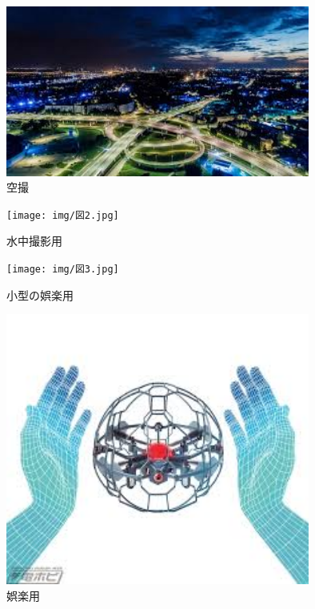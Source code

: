 \begin{figure}[htbp]
  \begin{center}
    \includegraphics[width=100mm]{img/空撮.jpg}
    \end{center}
  \caption{空撮}
 \label{fig:robot}
\end{figure}

\begin{figure}[htbp]
  \begin{center}
    \texttt{[image: img/図2.jpg]}
    \end{center}
  \caption{水中撮影用}
 \label{fig:robot}
\end{figure}

\begin{figure}[htbp]
  \begin{center}
    \texttt{[image: img/図3.jpg]}
    \end{center}
  \caption{小型の娯楽用}
 \label{fig:robot}
\end{figure}

\begin{figure}[htbp]
  \begin{center}
    \includegraphics[width=100mm]{img/ダウンロード.jpg}
    \end{center}
  \caption{娯楽用}
 \label{fig:robot}
\end{figure}

